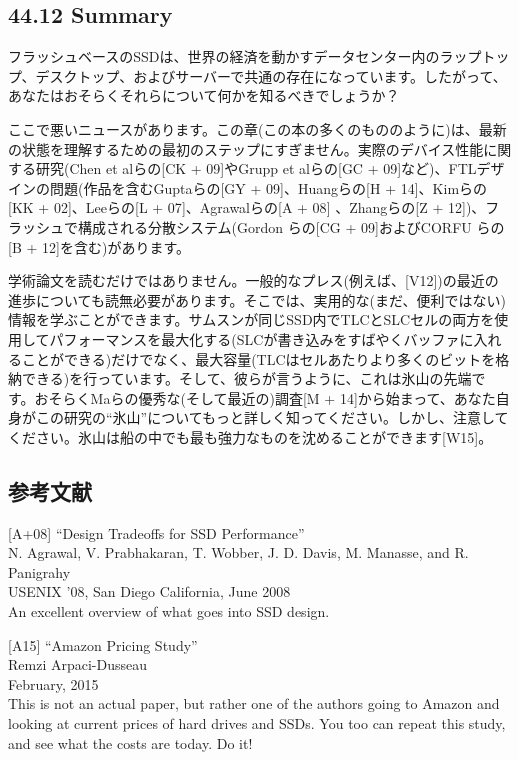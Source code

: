 \hypertarget{summary-32}{%
\subsection*{44.12 Summary}\label{summary-32}}

フラッシュベースのSSDは、世界の経済を動かすデータセンター内のラップトップ、デスクトップ、およびサーバーで共通の存在になっています。したがって、あなたはおそらくそれらについて何かを知るべきでしょうか？

ここで悪いニュースがあります。この章(この本の多くのもののように)は、最新の状態を理解するための最初のステップにすぎません。実際のデバイス性能に関する研究(Chen
et alらの{[}CK + 09{]}やGrupp et alらの{[}GC +
09{]}など)、FTLデザインの問題(作品を含むGuptaらの{[}GY +
09{]}、Huangらの{[}H + 14{]}、Kimらの{[}KK + 02{]}、Leeらの{[}L +
07{]}、Agrawalらの{[}A + 08{]} 、Zhangらの{[}Z +
12{]})、フラッシュで構成される分散システム(Gordon らの{[}CG +
09{]}およびCORFU らの{[}B + 12{]}を含む)があります。

学術論文を読むだけではありません。一般的なプレス(例えば、{[}V12{]})の最近の進歩についても読無必要があります。そこでは、実用的な(まだ、便利ではない)情報を学ぶことができます。サムスンが同じSSD内でTLCとSLCセルの両方を使用してパフォーマンスを最大化する(SLCが書き込みをすばやくバッファに入れることができる)だけでなく、最大容量(TLCはセルあたりより多くのビットを格納できる)を行っています。そして、彼らが言うように、これは氷山の先端です。おそらくMaらの優秀な(そして最近の)調査{[}M
+
14{]}から始まって、あなた自身がこの研究の``氷山''についてもっと詳しく知ってください。しかし、注意してください。氷山は船の中でも最も強力なものを沈めることができます{[}W15{]}。

\hypertarget{ux53c2ux8003ux6587ux732e-31}{%
\subsection*{参考文献}\label{ux53c2ux8003ux6587ux732e-31}}

{[}A+08{]} ``Design Tradeoffs for SSD Performance''\\
N. Agrawal, V. Prabhakaran, T. Wobber, J. D. Davis, M. Manasse, and R.
Panigrahy\\
USENIX '08, San Diego California, June 2008\\
An excellent overview of what goes into SSD design.

{[}A15{]} ``Amazon Pricing Study''\\
Remzi Arpaci-Dusseau\\
February, 2015\\
This is not an actual paper, but rather one of the authors going to
Amazon and looking at current prices of hard drives and SSDs. You too
can repeat this study, and see what the costs are today. Do it!

